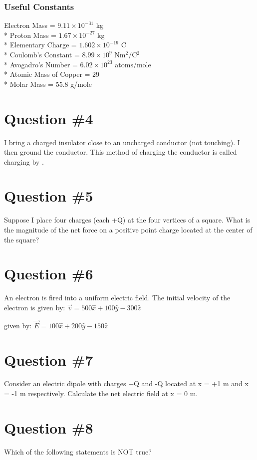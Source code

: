 \documentclass[12pt]{article}
\begin{document}
\subsubsection*{Useful Constants}
Electron Mass = $9.11 \times 10^{-31}$ kg \\*
Proton Mass = $1.67 \times 10^{-27}$ kg \\*
Elementary Charge = $1.602 \times 10^{-19}$ C \\*
Coulomb's Constant = $8.99 \times 10^9$ Nm$^2$/C$^2$ \\*
Avogadro's Number = $ 6.02 \times 10^{23}$ atoms/mole \\*
Atomic Mass of Copper = 29 \\*
Molar Mass = 55.8 g/mole

\section*{Question \#4}
I bring a charged insulator close to an uncharged conductor (not touching).  I then ground the conductor.  This method of charging the conductor is called charging by \underline{\hspace{1cm}}.

\section*{Question \#5}
Suppose I place four charges (each +Q) at the four vertices of a square.  What is the magnitude of the net force on a positive point charge located at the center of the square?

\section*{Question \#6}
An electron is fired into a uniform electric field.  The initial velocity of the electron is given by:
$\vec{v} = 500 \hat{x} + 100 \hat{y} - 300 \hat{z}$

 given by:
$\vec{E} = 100 \hat{x} + 200 \hat{y} - 150 \hat{z}$

\section*{Question \#7}
Consider an electric dipole with charges +Q and -Q located at x = +1 m and x = -1 m respectively.  Calculate the net electric field at x = 0 m.

\section*{Question \#8}
Which of the following statements is NOT true?
\end{document}
